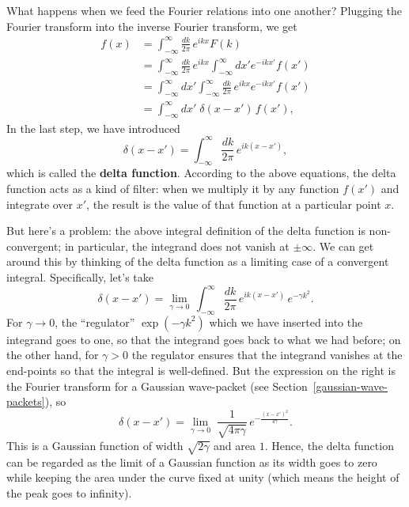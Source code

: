 \documentclass[10pt,a4paper]{article}
\begin{document}
What happens when we feed the Fourier relations into one another?
Plugging the Fourier transform into the inverse Fourier transform, we
get
\begin{align}
  f(x) &= \int_{-\infty}^\infty \frac{dk}{2\pi} \, e^{ikx} F(k) \\
  &= \int_{-\infty}^\infty \frac{dk}{2\pi} \, e^{ikx} \int_{-\infty}^\infty dx'
  e^{-ikx'} f(x')\\
  &= \int_{-\infty}^\infty dx' \int_{-\infty}^\infty \frac{dk}{2\pi} \,
  e^{ikx}  e^{-ikx'} f(x')\\
  &= \int_{-\infty}^\infty  dx' \; \delta(x-x')\, f(x'),
\end{align}
In the last step, we have introduced
\begin{equation}
\delta(x-x') = \int_{-\infty}^\infty \frac{dk}{2\pi} \, e^{ik(x-x')},
\end{equation}
which is called the \textbf{delta function}. According to the above
equations, the delta function acts as a kind of filter: when we multiply
it by any function $f(x')$ and integrate over $x'$, the result is
the value of that function at a particular point $x$.

But here's a problem: the above integral definition of the delta
function is non-convergent; in particular, the integrand does not vanish
at $\pm \infty$. We can get around this by thinking of the delta
function as a limiting case of a convergent integral. Specifically,
let's take
\begin{equation}
\delta(x-x') = \lim_{\gamma \rightarrow 0} \, \int_{-\infty}^\infty \frac{dk}{2\pi} \, e^{ik(x-x')} \, e^{-\gamma k^2}.
\end{equation}
For $\gamma \rightarrow 0$, the ``regulator'' $\exp(-\gamma k^2)$
which we have inserted into the integrand goes to one, so that the
integrand goes back to what we had before; on the other hand, for
$\gamma > 0$ the regulator ensures that the integrand vanishes at the
end-points so that the integral is well-defined. But the expression on
the right is the Fourier transform for a Gaussian wave-packet (see
Section~\ref{gaussian-wave-packets}), so
\begin{equation}
\delta(x-x') = \lim_{\gamma \rightarrow 0} \; \frac{1}{\sqrt{4\pi\gamma}} \, e^{-\frac{(x-x')^2}{4\gamma}}.
\end{equation}
This is a Gaussian function of width $\sqrt{2\gamma}$ and area
$1$. Hence, the delta function can be regarded as the limit of a
Gaussian function as its width goes to zero while keeping the area
under the curve fixed at unity (which means the height of the peak
goes to infinity).
\end{document}
